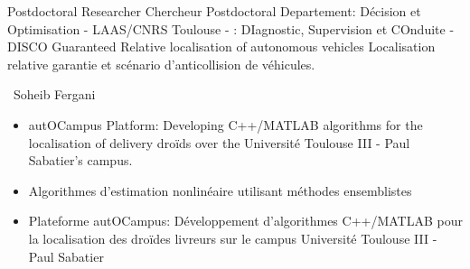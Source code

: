 \cventry{\may\ 2023 \newline \may\ 2024\newline}
{
  \ml
  {Postdoctoral Researcher}
  {}
  {Chercheur Postdoctoral}%
}
{\newline Departement: Décision et Optimisation - LAAS/CNRS}
{\newline Toulouse - \france
\newline{}: DIagnostic, Supervision et COnduite - DISCO}
{\newline
  \ml
  {Guaranteed Relative localisation of autonomous vehicles}
  {}
  {Localisation relative garantie et scénario d'anticollision de véhicules}.
}
{
  \supervisor\ Soheib Fergani
  \ml
  {
    \begin{itemize}
      \item autOCampus Platform: Developing C++/MATLAB algorithms for the localisation of delivery droïds over the Université Toulouse III - Paul Sabatier's campus.
    \end{itemize}
  }
  {}
  {\begin{itemize}
    \item Algorithmes d'estimation nonlinéaire utilisant méthodes ensemblistes
    \item Plateforme autOCampus: Développement d'algorithmes C++/MATLAB pour la localisation des droïdes livreurs sur le campus Université Toulouse III - Paul Sabatier
  \end{itemize}
  }
}


